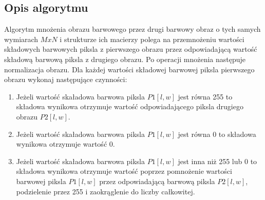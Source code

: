\documentclass[a4paper,12pt, titlepage]{report}
\begin{document}
\subsection*{Opis algorytmu}
\par Algorytm mnożenia obrazu barwowego przez drugi barwowy obraz o tych samych wymiarach \(MxN\) i strukturze ich macierzy polega na przemnożeniu wartości składowych barwowych piksla z pierwszego obrazu przez odpowiadającą wartość składową barwową piksla z drugiego obrazu. Po operacji mnożenia następuje normalizacja obrazu. Dla każdej wartości składowej barwowej piksla pierwszego obrazu wykonaj następujące czynności:
\begin{enumerate}
\item Jeżeli wartość skaładowa barwowa piksla \(P1[l,w]\) jest równa 255 to składowa wynikowa otrzymuje wartość odpowiadającego piksla drugiego obrazu \(P2[l,w]\).
\item Jeżeli wartość skaładowa barwowa piksla \(P1[l,w]\) jest równa 0 to składowa wynikowa otrzymuje wartość 0.
\item Jeżeli wartość skaładowa barwowa piksla \(P1[l,w]\) jest inna niż 255 lub 0 to składowa wynikowa otrzymuje wartość poprzez pomnożenie wartości barwowej piksla \(P1[l,w]\) przez odpowiadającą barwową piksla \(P2[l,w]\), podzielenie przez 255 i zaokrąglenie do liczby całkowitej.
\end{enumerate}
\end{document}

